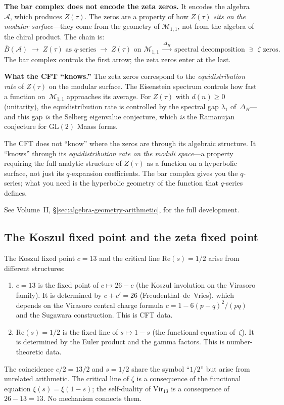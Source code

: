 \documentclass[11pt]{article}
\newcommand{\cA}{\mathcal{A}}
\newcommand{\cM}{\mathcal{M}}
\newcommand{\barB}{\overline{B}}
\begin{document}
\textbf{The bar complex does not encode the zeta zeros.}  It
encodes the algebra~$\cA$, which produces $Z(\tau)$.  The
zeros are a property of how $Z(\tau)$ \emph{sits on the
modular surface}---they come from the geometry of
$\cM_{1,1}$, not from the algebra of the chiral product.
The chain is:
\[
  \barB(\cA) \;\to\; Z(\tau) \text{ as $q$-series}
  \;\to\; Z(\tau) \text{ on } \cM_{1,1}
  \;\xrightarrow{\Delta_H}\;
  \text{spectral decomposition} \;\ni\; \zeta\text{ zeros}.
\]
The bar complex controls the first arrow; the zeta zeros
enter at the last.

\textbf{What the CFT ``knows.''}  The zeta zeros correspond
to the \emph{equidistribution rate} of $Z(\tau)$ on the
modular surface.  The Eisenstein spectrum controls how fast
a function on~$\cM_{1,1}$ approaches its average.  For
$Z(\tau)$ with $d(n) \geq 0$ (unitarity), the
equidistribution rate is controlled by the spectral gap
$\lambda_1$ of~$\Delta_H$---and this gap \emph{is} the
Selberg eigenvalue conjecture, which \emph{is} the Ramanujan
conjecture for $\mathrm{GL}(2)$ Maass forms.

The CFT does not ``know'' where the zeros are through its
algebraic structure.  It ``knows'' through its
\emph{equidistribution rate on the moduli space}---a property
requiring the full analytic structure of $Z(\tau)$ as a
function on a hyperbolic surface, not just its $q$-expansion
coefficients.  The bar complex gives you the $q$-series; what
you need is the hyperbolic geometry of the function that
$q$-series defines.

See Volume~II, \S\ref*{sec:algebra-geometry-arithmetic},
for the full development.

\subsection{The Koszul fixed point and the zeta fixed point}

\begin{proposition}
\label{prop:two-fixed-points}
The Koszul fixed point $c = 13$ and the critical line
$\mathrm{Re}(s) = 1/2$ arise from different structures:
\begin{enumerate}[label=\textup{(\roman*)}]
\item $c = 13$ is the fixed point of $c \mapsto 26 - c$ (the
  Koszul involution on the Virasoro family).  It is determined
  by $c + c' = 26$ (Freudenthal--de~Vries), which depends on
  the Virasoro central charge formula $c = 1 - 6(p-q)^2/(pq)$
  and the Sugawara construction.  This is CFT data.
\item $\mathrm{Re}(s) = 1/2$ is the fixed line of
  $s \mapsto 1 - s$ (the functional equation of~$\zeta$).  It is
  determined by the Euler product and the gamma factors.  This
  is number-theoretic data.
\end{enumerate}
The coincidence $c/2 = 13/2$ and $s = 1/2$ share the symbol
``$1/2$'' but arise from unrelated arithmetic.  The critical
line of $\zeta$ is a consequence of the functional equation
$\xi(s) = \xi(1-s)$; the self-duality of $\mathrm{Vir}_{13}$
is a consequence of $26 - 13 = 13$.  No mechanism connects them.
\end{proposition}
\end{document}
